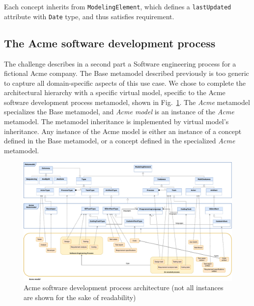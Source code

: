 Each concept inherits from \texttt{ModelingElement}, which defines a
\texttt{lastUpdated} attribute with \texttt{Date} type, and thus satisfies
 requirement.

\subsection{The Acme software development process}
\label{sec:AcmeSoftwareDevelopmentProcess}

The challenge describes in a second part a Software engineering process for a
fictional Acme company. The Base metamodel described previously is too generic
to capture all domain-specific aspects of this use case. We chose to complete
the architectural hierarchy with a specific virtual model, specific to the Acme
software development process metamodel, shown in
Fig.~\ref{fig:AcmeFullArchitecture}.  The \textit{Acme} metamodel specializes
the Base metamodel, and \textit{Acme model} is an instance of the \textit{Acme}
metamodel. The metamodel inheritance is implemented by virtual model's
inheritance. Any instance of the Acme model is either an instance of a concept
defined in the Base metamodel, or a concept defined in the specialized
\textit{Acme} metamodel.


\begin{figure}
 \centering
     \includegraphics[width=1.0 \textwidth]{Figures/AcmeFullArchitecture-1.5.pdf}
     \caption{Acme software development process architecture (not all instances are shown for the sake of readability)}
    \label{fig:AcmeFullArchitecture}
\end{figure}

